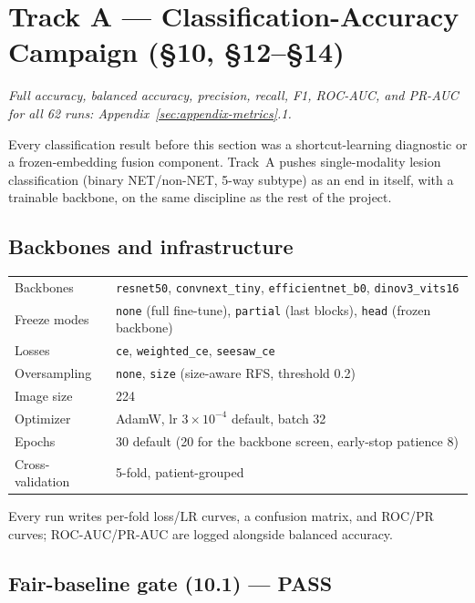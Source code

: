 \documentclass[10pt]{article}
\begin{document}
\clearpage
\section{Track A --- Classification-Accuracy Campaign (\S10, \S12--\S14)}
\label{sec:tracka}

\noindent\textit{Full accuracy, balanced accuracy, precision, recall, F1, ROC-AUC, and PR-AUC for all 62 runs: Appendix~\ref{sec:appendix-metrics}.1.}

Every classification result before this section was a shortcut-learning diagnostic or a frozen-embedding
fusion component. Track~A pushes single-modality lesion classification (binary NET/non-NET, 5-way subtype)
as an end in itself, with a trainable backbone, on the same discipline as the rest of the project.

\subsection{Backbones and infrastructure}

\begin{center}
\begin{tabular}{ll}
\toprule
Backbones & \texttt{resnet50}, \texttt{convnext\_tiny}, \texttt{efficientnet\_b0}, \texttt{dinov3\_vits16} \\
Freeze modes & \texttt{none} (full fine-tune), \texttt{partial} (last blocks), \texttt{head} (frozen backbone) \\
Losses & \texttt{ce}, \texttt{weighted\_ce}, \texttt{seesaw\_ce} \\
Oversampling & \texttt{none}, \texttt{size} (size-aware RFS, threshold 0.2) \\
Image size & 224 \\
Optimizer & AdamW, lr $3\times10^{-4}$ default, batch 32 \\
Epochs & 30 default (20 for the backbone screen, early-stop patience 8) \\
Cross-validation & 5-fold, patient-grouped \\
\bottomrule
\end{tabular}
\end{center}

Every run writes per-fold loss/LR curves, a confusion matrix, and ROC/PR curves; ROC-AUC/PR-AUC are logged
alongside balanced accuracy.

\subsection{Fair-baseline gate (10.1) --- PASS}
\end{document}
